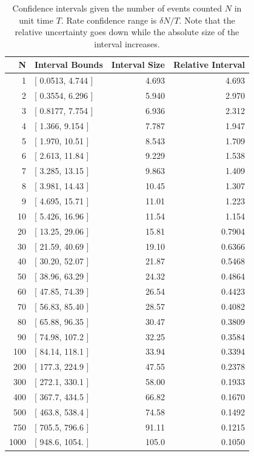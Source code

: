 \documentclass{article}
\begin{document}
\begin{table}
    \begin{tabular}{r|l|r|r}
     \hline
N & Interval Bounds & Interval Size & Relative Interval\\ 
\hline 
1 &  [ 0.0513, 4.744 ] & 4.693 & 4.693\\ 
2 &  [ 0.3554, 6.296 ] & 5.940 & 2.970\\ 
3 &  [ 0.8177, 7.754 ] & 6.936 & 2.312\\ 
4 &  [ 1.366, 9.154 ] & 7.787 & 1.947\\ 
5 &  [ 1.970, 10.51 ] & 8.543 & 1.709\\ 
6 &  [ 2.613, 11.84 ] & 9.229 & 1.538\\ 
7 &  [ 3.285, 13.15 ] & 9.863 & 1.409\\ 
8 &  [ 3.981, 14.43 ] & 10.45 & 1.307\\ 
9 &  [ 4.695, 15.71 ] & 11.01 & 1.223\\ 
10 &  [ 5.426, 16.96 ] & 11.54 & 1.154\\ 
20 &  [ 13.25, 29.06 ] & 15.81 & 0.7904\\ 
30 & [ 21.59, 40.69 ] & 19.10 & 0.6366\\ 
40 & [ 30.20, 52.07 ] & 21.87 & 0.5468\\ 
50 & [ 38.96, 63.29 ] & 24.32 & 0.4864\\ 
60 & [ 47.85, 74.39 ] & 26.54 & 0.4423\\ 
70 & [ 56.83, 85.40 ] & 28.57 & 0.4082\\ 
80 & [ 65.88, 96.35 ] & 30.47 & 0.3809\\ 
90 & [ 74.98, 107.2 ] & 32.25 & 0.3584\\ 
100 & [ 84.14, 118.1 ] & 33.94 & 0.3394\\ 
200 & [ 177.3, 224.9 ] & 47.55 & 0.2378\\ 
300 & [ 272.1, 330.1 ] & 58.00 & 0.1933\\ 
400 & [ 367.7, 434.5 ] & 66.82 & 0.1670\\ 
500 & [ 463.8, 538.4 ] & 74.58 & 0.1492\\ 
750 & [ 705.5, 796.6 ] & 91.11 & 0.1215\\ 
1000 & [ 948.6,  1054. ] & 105.0 & 0.1050\\ 
\end{tabular}
\caption{Confidence intervals given the number of events counted $N$ in unit time $T$.  Rate confidence 
range is $\delta N/T$. Note that the relative uncertainty goes down while the absolute size of the interval increases.}
\label{tab:conf}
\end{table}
\end{document}
